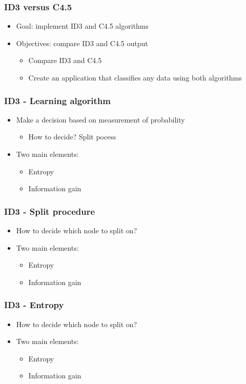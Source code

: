 \documentclass{beamer}
\begin{document}
\begin{frame}
\frametitle{ID3 versus C4.5}
	\begin{itemize}
		\item Goal: implement ID3 and C4.5 algorithms
		\vfill
		\item Objectives: compare ID3 and C4.5 output
		\vfill
		\begin{itemize}
			\item Compare ID3 and C4.5
			\vfill
			\item Create an application that classifies any data using both algorithms
		\end{itemize}

	\end{itemize}

\end{frame}


\begin{frame}
\frametitle{ID3 - Learning algorithm}
\begin{itemize}
		\item  Make a decision based on measurement of probability
		\begin{itemize}
			\item How to decide? Split pocess
		\end{itemize}
		\item Two main elements:
		\begin{itemize}
			\item Entropy
			\item Information gain
		\end{itemize}

	\end{itemize}
\end{frame}

\begin{frame}
\frametitle{ID3 - Split procedure}
\begin{itemize}
		\item  How to decide which node to split on? 
		\item Two main elements:
		\begin{itemize}
			\item Entropy
			\item Information gain
		\end{itemize}

	\end{itemize}
\end{frame}

\begin{frame}
\frametitle{ID3 - Entropy}
\begin{itemize}
		\item  How to decide which node to split on? 
		\item Two main elements:
		\begin{itemize}
			\item Entropy
			\item Information gain
		\end{itemize}

	\end{itemize}
\end{frame}
\end{document}
